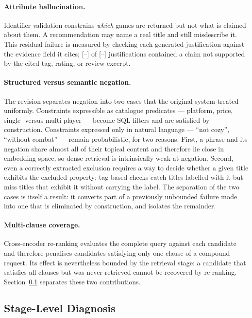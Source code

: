 \paragraph{Attribute hallucination.}
Identifier validation constrains \emph{which} games are returned but not what is
claimed about them. A recommendation may name a real title and still misdescribe
it. This residual failure is measured by checking each generated justification
against the evidence field it cites; [--] of [--] justifications contained a
claim not supported by the cited tag, rating, or review excerpt.

\paragraph{Structured versus semantic negation.}
The revision separates negation into two cases that the original system treated
uniformly. Constraints expressible as catalogue predicates --- platform, price,
single- versus multi-player --- become SQL filters and are satisfied by
construction. Constraints expressed only in natural language --- ``not cozy'',
``without combat'' --- remain probabilistic, for two reasons. First, a phrase
and its negation share almost all of their topical content and therefore lie
close in embedding space, so dense retrieval is intrinsically weak at negation.
Second, even a correctly extracted exclusion requires a way to decide whether a
given title exhibits the excluded property; tag-based checks catch titles
labelled with it but miss titles that exhibit it without carrying the label. The
separation of the two cases is itself a result: it converts part of a previously
unbounded failure mode into one that is eliminated by construction, and isolates
the remainder.

\paragraph{Multi-clause coverage.}
Cross-encoder re-ranking evaluates the complete query against each candidate and
therefore penalises candidates satisfying only one clause of a compound request.
Its effect is nevertheless bounded by the retrieval stage: a candidate that
satisfies all clauses but was never retrieved cannot be recovered by re-ranking.
Section~\ref{sec:post-eval-stages} separates these two contributions.

\subsection{Stage-Level Diagnosis}
\label{sec:post-eval-stages}

